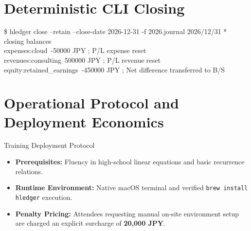 \section{Deterministic CLI Closing}
\begin{terminalbox}{\$ hledger close --retain --close-date 2026-12-31 -f 2026.journal}
2026/12/31 * closing balances\\
\quad expenses:cloud\qquad\qquad\ -50000 JPY \quad ; P/L expense reset\\
\quad revenues:consulting\qquad\ 500000 JPY \quad ; P/L revenue reset\\
\quad equity:retained\_earnings\ -450000 JPY \quad ; Net difference transferred to B/S
\end{terminalbox}

\section{Operational Protocol and Deployment Economics}
\begin{rulebox}{Training Deployment Protocol}
\begin{itemize}
    \item \textbf{Prerequisites:} Fluency in high-school linear equations and basic recurrence relations.
    \item \textbf{Runtime Environment:} Native macOS terminal and verified \texttt{brew install hledger} execution.
    \item \textbf{Penalty Pricing:} Attendees requesting manual on-site environment setup are charged an explicit surcharge of \textbf{20,000 JPY}.
\end{itemize}
\end{rulebox}
\fi
